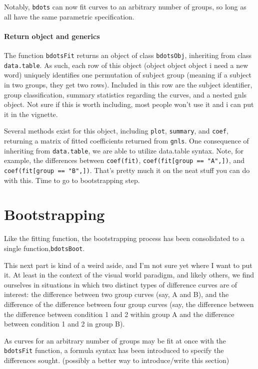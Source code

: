 \documentclass{article}
\begin{document}
Notably, \texttt{bdots} can now fit curves to an arbitrary number of groups, so long as all have the same parametric specification.


\paragraph{Return object and generics}

The function \texttt{bdotsFit} returns an object of class \texttt{bdotsObj}, inheriting from class \texttt{data.table}. As such, each row of this object (object object object i need a new word) uniquely identifies one permutation of subject group (meaning if a subject in two groups, they get two rows). Included in this row are the subject identifier, group classification, summary statistics regarding the curves, and a nested gnls object. Not sure if this is worth including, most people won't use it and i can put it in the vignette.


Several methods exist for this object, including \texttt{plot}, \texttt{summary}, and \texttt{coef}, returning a matrix of fitted coefficients returned from \texttt{gnls}. One consequence of inheriting from \texttt{data.table}, we are able to utilize data.table syntax. Note, for example, the differences between \texttt{coef(fit)}, \texttt{coef(fit[group == "A",])}, and \texttt{coef(fit[group == "B",])}. That's pretty much it on the neat stuff you can do with this. Time to go to bootstrapping step.

\section{Bootstrapping}

Like the fitting function, the bootstrapping process has been consolidated to a single function,\texttt{bdotsBoot}.

This next part is kind of a weird aside, and I'm not sure yet where I want to put it. At least in the context of the visual world paradigm, and likely others, we find ourselves in situations in which two distinct types of difference curves are of interest: the difference between two group curves (say, A and B), and the difference of the difference between four group curves (say, the difference between the difference between condition 1 and 2 within group A and the difference between condition 1 and 2 in group B). 

As curves for an arbitrary number of groups may be fit at once with the \texttt{bdotsFit} function, a formula syntax has been introduced to specify the differences sought. (possibly a better way to introduce/write this section) 
\end{document}
